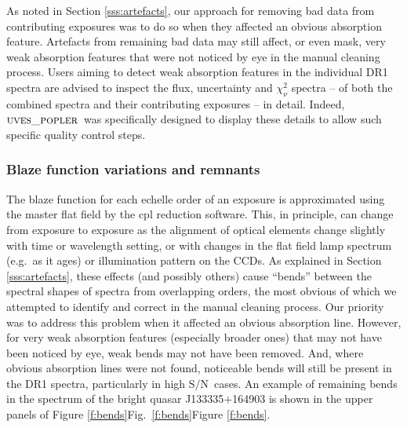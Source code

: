 \documentclass[fleqn,usenatbib,usedcolumn]{mnras}
\newcommand{\Sref}[1]{Section \ref{#1}}
\newcommand{\Fref}[1]{\ifhmode \ifnum\spacefactor=1001 Figure \ref{#1}\else Fig.\ \ref{#1}\fi \else Figure \ref{#1}\fi}
\newcommand{\SN}{\ensuremath{\textrm{S/N}}}
\newcommand{\popler}{\ensuremath{\textsc{uves\_popler}}}
\begin{document}
As noted in \Sref{sss:artefacts}, our approach for removing bad data from contributing exposures was to do so when they affected an obvious absorption feature. Artefacts from remaining bad data may still affect, or even mask, very weak absorption features that were not noticed by eye in the manual cleaning process. Users aiming to detect weak absorption features in the individual DR1 spectra are advised to inspect the flux, uncertainty and $\chi^2_\nu$ spectra -- of both the combined spectra and their contributing exposures -- in detail. Indeed, \popler\ was specifically designed to display these details to allow such specific quality control steps.

\subsubsection{Blaze function variations and remnants}\label{sss:blaze}

The blaze function for each echelle order of an exposure is approximated using the master flat field by the {\sc cpl} reduction software. This, in principle, can change from exposure to exposure as the alignment of optical elements change slightly with time or wavelength setting, or with changes in the flat field lamp spectrum (e.g.\ as it ages) or illumination pattern on the CCDs. As explained in \Sref{sss:artefacts}, these effects (and possibly others) cause ``bends'' between the spectral shapes of spectra from overlapping orders, the most obvious of which we attempted to identify and correct in the manual cleaning process. Our priority was to address this problem when it affected an obvious absorption line. However, for very weak absorption features (especially broader ones) that may not have been noticed by eye, weak bends may not have been removed. And, where obvious absorption lines were not found, noticeable bends will still be present in the DR1 spectra, particularly in high \SN\ cases. An example of remaining bends in the spectrum of the bright quasar J133335$+$164903 is shown in the upper panels of \Fref{f:bends}.
 
\end{document}
